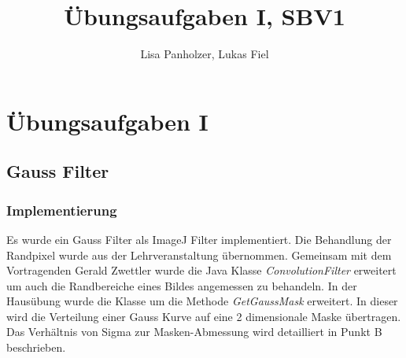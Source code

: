 \documentclass[12pt,german]{article}
\begin{document}
\title{Übungsaufgaben I, SBV1 }
\author{Lisa Panholzer, Lukas Fiel}
\maketitle


\newpage
\section{Übungsaufgaben I}
\subsection{Gauss Filter}
\subsubsection{Implementierung}
\label{sec:Gausfilterimplementierung}
Es wurde ein Gauss Filter als ImageJ Filter implementiert. Die Behandlung der Randpixel wurde aus der Lehrveranstaltung übernommen. Gemeinsam mit dem Vortragenden Gerald Zwettler wurde die Java Klasse \textit{ConvolutionFilter} erweitert um auch die Randbereiche eines Bildes angemessen zu behandeln. In der Hausübung wurde die Klasse um die Methode \textit{GetGaussMask} erweitert. In dieser wird die Verteilung einer Gauss Kurve auf eine 2 dimensionale Maske übertragen. 
Das Verhältnis von Sigma zur Masken-Abmessung wird detailliert in Punkt B beschrieben.\\



\end{document}
